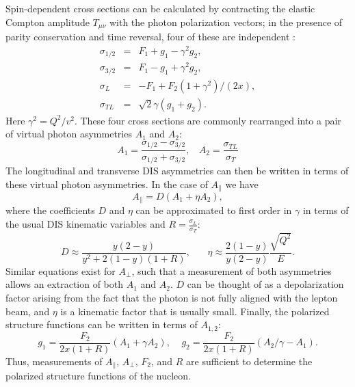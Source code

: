 Spin-dependent cross sections can be calculated by contracting the elastic
Compton amplitude $T_{\mu \nu}$ with the photon polarization vectors; in the
presence of parity conservation and time reversal, four of these are
independent \cite{}:
%
\begin{eqnarray}
  \sigma_{1/2} & = & F_1 + g_1 - \gamma^2 g_2, \nonumber \\
  \sigma_{3/2} & = & F_1 - g_1 + \gamma^2 g_2, \nonumber \\
  \sigma_L & = & -F_1 + F_2(1+\gamma^2)/(2x),  \nonumber \\
  \sigma_{TL} & = & \sqrt{2}\gamma (g_1+g_2).
\end{eqnarray}
%
Here $\gamma^2 = Q^2/v^2$. These four cross sections are commonly rearranged
into a pair of virtual photon asymmetries $A_1$ and $A_2$:
%
\begin{equation}
  A_1 = \frac{\sigma_{1/2} - \sigma_{3/2}}{\sigma_{1/2} + \sigma_{3/2}}, ~~~~ A_2 = \frac{\sigma_{TL}}{\sigma_T}
\end{equation}
%
The longitudinal and transverse DIS asymmetries can then be written in terms
of these virtual photon asymmetries. In the case of $A_{\parallel}$ we have
\begin{equation}
  A_{\parallel} = D(A_1 + \eta A_2),
\end{equation}
%
where the coefficients $D$ and $\eta$ can be approximated to first order in
$\gamma$ in terms of the usual DIS kinematic variables and $R =
\frac{\sigma_{L}}{\sigma_T}$:
\begin{equation}
  D \approx \frac{y(2-y)}{y^2 + 2(1-y)(1+R)}, ~~~~~~~~ \eta \approx \frac{2(1-y)}{y(2-y)} \frac{\sqrt{Q^2}}{E}.
\end{equation}
%
Similar equations exist for $A_{\perp}$, such that a measurement of both
asymmetries allows an extraction of both $A_1$ and $A_2$. $D$ can be thought
of as a depolarization factor arising from the fact that the photon is not
fully aligned with the lepton beam, and $\eta$ is a kinematic factor that is
usually small. Finally, the polarized structure functions can be written in
terms of $A_{1,2}$:
\begin{equation}
  g_1 = \frac{F_2}{2x(1+R)}(A_1+\gamma A_2), ~~~~~ g_2 = \frac{F_2}{2x(1+R)}(A_2/\gamma - A_1).
\end{equation}
Thus, measurements of $A_{\parallel}$, $A_{\perp}$, $F_2$, and $R$ are
sufficient to determine the polarized structure functions of the nucleon.

